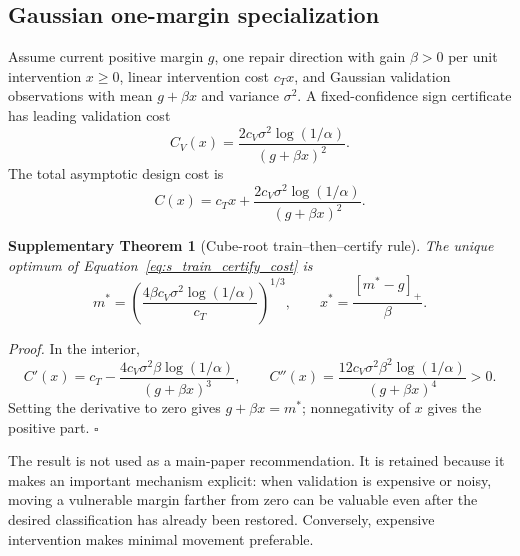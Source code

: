 \documentclass[11pt,letterpaper]{article}
\theoremstyle{plain}
\newtheorem{theorem}{Supplementary Theorem}
\newcommand{\1}{\mathbf 1}
\begin{document}
\subsection{Gaussian one-margin specialization}
Assume current positive margin $g$, one repair direction with gain $\beta>0$ per unit intervention $x\ge0$, linear intervention cost $c_Tx$, and Gaussian validation observations with mean $g+\beta x$ and variance $\sigma^2$. A fixed-confidence sign certificate has leading validation cost
\begin{equation}
 C_V(x)=\frac{2c_V\sigma^2\log(1/\alpha)}{(g+\beta x)^2}.
\label{eq:s_gaussian_validation_cost}
\end{equation}
The total asymptotic design cost is
\begin{equation}
 C(x)=c_Tx+\frac{2c_V\sigma^2\log(1/\alpha)}{(g+\beta x)^2}.
\label{eq:s_train_certify_cost}
\end{equation}

\begin{theorem}[Cube-root train--then--certify rule]
The unique optimum of Equation~\ref{eq:s_train_certify_cost} is
\begin{equation}
 m^*=\left(\frac{4\beta c_V\sigma^2\log(1/\alpha)}{c_T}\right)^{1/3},
 \qquad
 x^*=\frac{[m^*-g]_+}{\beta}.
\label{eq:s_cube_root}
\end{equation}
\end{theorem}
\textit{Proof.} In the interior,
\begin{equation}
 C'(x)=c_T-\frac{4c_V\sigma^2\beta\log(1/\alpha)}{(g+\beta x)^3},
\qquad
 C''(x)=\frac{12c_V\sigma^2\beta^2\log(1/\alpha)}{(g+\beta x)^4}>0.
\label{eq:s_cube_derivative}
\end{equation}
Setting the derivative to zero gives $g+\beta x=m^*$; nonnegativity of $x$ gives the positive part. $\square$

The result is not used as a main-paper recommendation. It is retained because it makes an important mechanism explicit: when validation is expensive or noisy, moving a vulnerable margin farther from zero can be valuable even after the desired classification has already been restored. Conversely, expensive intervention makes minimal movement preferable.
\end{document}
